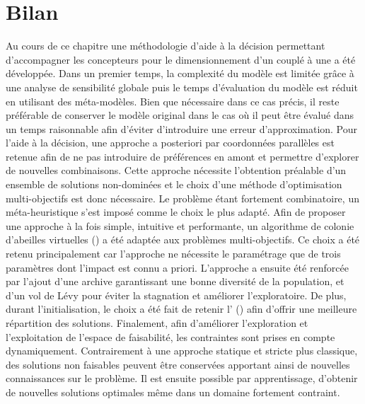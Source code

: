 \section{Bilan} %
\label{sec:bilan_methodologie}
Au cours de ce chapitre une méthodologie d’aide à la décision permettant d’accompagner les
concepteurs pour le dimensionnement d’un  couplé à une  a été
développée. Dans un premier temps, la complexité du modèle est limitée grâce à une analyse
de sensibilité globale puis le temps d’évaluation du modèle est réduit en utilisant des
méta-modèles. Bien que nécessaire dans ce cas précis, il reste préférable de conserver le
modèle original dans le cas où il peut être évalué dans un temps raisonnable afin d’éviter
d’introduire une erreur d’approximation. Pour l’aide à la décision, une approche a
posteriori par coordonnées parallèles est retenue afin de ne pas introduire de préférences
en amont et permettre d’explorer de nouvelles combinaisons. Cette approche
nécessite l’obtention préalable d’un ensemble de solutions non-dominées et le choix d’une
méthode d’optimisation multi-objectifs est donc nécessaire. Le problème étant fortement
combinatoire, un méta-heuristique s’est imposé comme le choix le plus adapté. Afin de
proposer une approche à la fois simple, intuitive et performante, un algorithme de colonie
d’abeilles virtuelles () a été adaptée aux problèmes multi-objectifs. Ce choix a
été retenu principalement car l’approche ne nécessite le paramétrage que de trois
paramètres dont l’impact est connu a priori. L’approche a ensuite été renforcée par
l’ajout d’une archive garantissant une bonne diversité de la population, et d’un vol de
Lévy pour éviter la stagnation et améliorer l’exploratoire. De plus, durant
l’initialisation, le choix a été fait de retenir l’ () afin
d’offrir une meilleure répartition des solutions. Finalement, afin d’améliorer
l’exploration et l’exploitation de l’espace de faisabilité, les contraintes
sont prises en compte dynamiquement. Contrairement à une approche statique et stricte plus
classique, des solutions non faisables peuvent être conservées apportant ainsi de nouvelles
connaissances sur le problème. Il est ensuite possible par apprentissage, d’obtenir de
nouvelles solutions optimales même dans un domaine fortement contraint.

